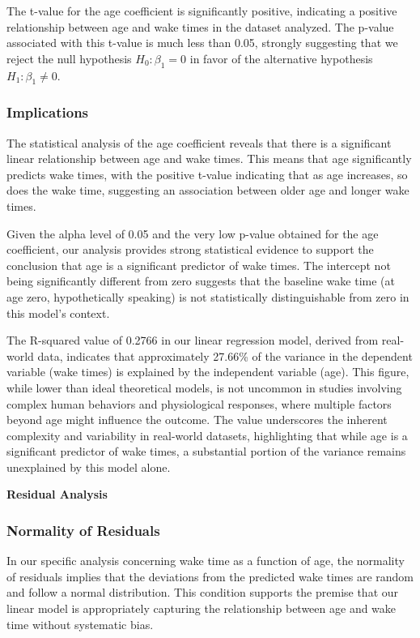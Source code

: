 \documentclass[
]{article}
\begin{document}
The t-value for the age coefficient is significantly positive,
indicating a positive relationship between age and wake times in the
dataset analyzed. The p-value associated with this t-value is much less
than 0.05, strongly suggesting that we reject the null hypothesis
\(H_0: \beta_{1} = 0\) in favor of the alternative hypothesis
\(H_1: \beta_{1} \neq 0\).

\subsubsection{Implications}\label{implications-1}

The statistical analysis of the age coefficient reveals that there is a
significant linear relationship between age and wake times. This means
that age significantly predicts wake times, with the positive t-value
indicating that as age increases, so does the wake time, suggesting an
association between older age and longer wake times.

Given the alpha level of 0.05 and the very low p-value obtained for the
age coefficient, our analysis provides strong statistical evidence to
support the conclusion that age is a significant predictor of wake
times. The intercept not being significantly different from zero
suggests that the baseline wake time (at age zero, hypothetically
speaking) is not statistically distinguishable from zero in this model's
context.

The R-squared value of 0.2766 in our linear regression model, derived
from real-world data, indicates that approximately 27.66\% of the
variance in the dependent variable (wake times) is explained by the
independent variable (age). This figure, while lower than ideal
theoretical models, is not uncommon in studies involving complex human
behaviors and physiological responses, where multiple factors beyond age
might influence the outcome. The value underscores the inherent
complexity and variability in real-world datasets, highlighting that
while age is a significant predictor of wake times, a substantial
portion of the variance remains unexplained by this model alone.

\textbf{Residual Analysis}

\subsubsection{Normality of Residuals}\label{normality-of-residuals-1}

In our specific analysis concerning wake time as a function of age, the
normality of residuals implies that the deviations from the predicted
wake times are random and follow a normal distribution. This condition
supports the premise that our linear model is appropriately capturing
the relationship between age and wake time without systematic bias.
\end{document}
